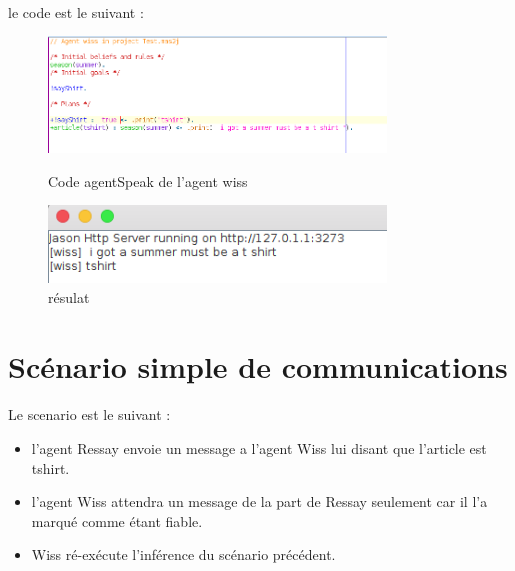 \paragraph{}
le code est le suivant : \\
\begin{figure}[H]
	\centering
	\includegraphics[width=0.8\textwidth]{imgs/jasonWiss.png}
	\caption{Code agentSpeak de l'agent wiss}
	\includegraphics[width=0.8\textwidth]{imgs/jasonWissDone.png}
	\caption{résulat}
\end{figure}
\section{Scénario simple de communications}
\paragraph{}
Le scenario est le suivant : 
\begin{itemize}[label = \textbullet]
	\item l'agent Ressay envoie un message a l'agent Wiss lui disant que l'article est tshirt.
	\item l'agent Wiss attendra un message de la part de Ressay seulement car il l'a marqué comme étant fiable.
	\item Wiss ré-exécute l'inférence du scénario précédent.
\end{itemize}

